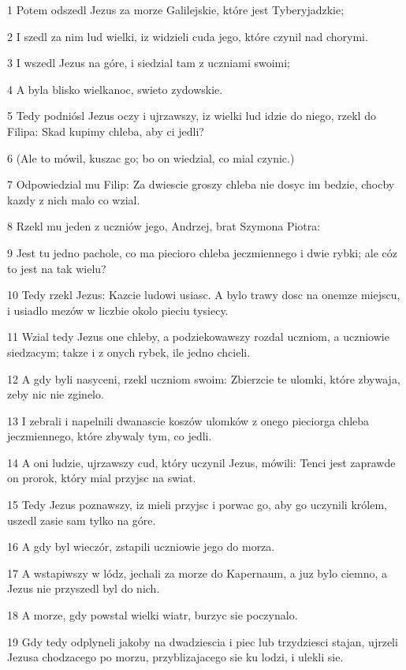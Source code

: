 \par 1 Potem odszedl Jezus za morze Galilejskie, które jest Tyberyjadzkie;
\par 2 I szedl za nim lud wielki, iz widzieli cuda jego, które czynil nad chorymi.
\par 3 I wszedl Jezus na góre, i siedzial tam z uczniami swoimi;
\par 4 A byla blisko wielkanoc, swieto zydowskie.
\par 5 Tedy podniósl Jezus oczy i ujrzawszy, iz wielki lud idzie do niego, rzekl do Filipa: Skad kupimy chleba, aby ci jedli?
\par 6 (Ale to mówil, kuszac go; bo on wiedzial, co mial czynic.)
\par 7 Odpowiedzial mu Filip: Za dwiescie groszy chleba nie dosyc im bedzie, chocby kazdy z nich malo co wzial.
\par 8 Rzekl mu jeden z uczniów jego, Andrzej, brat Szymona Piotra:
\par 9 Jest tu jedno pachole, co ma piecioro chleba jeczmiennego i dwie rybki; ale cóz to jest na tak wielu?
\par 10 Tedy rzekl Jezus: Kazcie ludowi usiasc. A bylo trawy dosc na onemze miejscu, i usiadlo mezów w liczbie okolo pieciu tysiecy.
\par 11 Wzial tedy Jezus one chleby, a podziekowawszy rozdal uczniom, a uczniowie siedzacym; takze i z onych rybek, ile jedno chcieli.
\par 12 A gdy byli nasyceni, rzekl uczniom swoim: Zbierzcie te ulomki, które zbywaja, zeby nic nie zginelo.
\par 13 I zebrali i napelnili dwanascie koszów ulomków z onego pieciorga chleba jeczmiennego, które zbywaly tym, co jedli.
\par 14 A oni ludzie, ujrzawszy cud, który uczynil Jezus, mówili: Tenci jest zaprawde on prorok, który mial przyjsc na swiat.
\par 15 Tedy Jezus poznawszy, iz mieli przyjsc i porwac go, aby go uczynili królem, uszedl zasie sam tylko na góre.
\par 16 A gdy byl wieczór, zstapili uczniowie jego do morza.
\par 17 A wstapiwszy w lódz, jechali za morze do Kapernaum, a juz bylo ciemno, a Jezus nie przyszedl byl do nich.
\par 18 A morze, gdy powstal wielki wiatr, burzyc sie poczynalo.
\par 19 Gdy tedy odplyneli jakoby na dwadziescia i piec lub trzydziesci stajan, ujrzeli Jezusa chodzacego po morzu, przyblizajacego sie ku lodzi, i ulekli sie.
